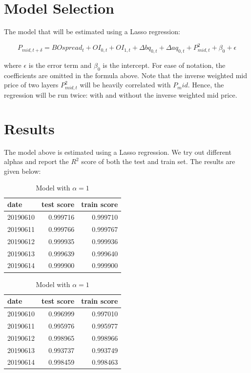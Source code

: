 \documentclass[english, 11pt, a4paper]{article}
\begin{document}
\section{Model Selection}
The model that will be estimated using a Lasso regression:

\begin{equation}
    P_{mid, t + \delta} = BOspread_{t} + OI_{0, t} + OI_{1,t} + \Delta bq_{0,t} + \Delta aq_{0,t} +
    P_{mid, t}^2 + \beta_0 + \epsilon 
\end{equation}

where $\epsilon$ is the error term and $\beta_0$ is the intercept. For ease of notation, the coefficients are omitted in the formula above. 
Note that the inverse weighted mid price of two layers $P_{mid, t}^2$ will be heavily correlated with $P_mid$. 
Hence, the regression will be run twice: with and without the inverse weighted mid price.

\section{Results}
The model above is estimated using a Lasso regression. We try out different alphas and report the
$R^2$ score of both the test and train set. The results are given below:

\begin{table}[H]
  \centering
  \begin{minipage}{.4\textwidth}
    \centering
    \begin{tabular}{lrr}
    \toprule
    date & test score & train score \\
    \midrule
    20190610 & 0.999716 & 0.999710 \\
    20190611 & 0.999766 & 0.999767 \\
    20190612 & 0.999935 & 0.999936 \\
    20190613 & 0.999639 & 0.999640 \\
    20190614 & 0.999900 & 0.999900 \\
    \bottomrule
    \end{tabular}
    \caption{Model with $\alpha = 0.04$}
  \end{minipage}
  \hspace{1cm}
  \begin{minipage}{.4\textwidth}
    \centering
    \begin{tabular}{lrr}
    \toprule
    date & test score & train score \\
    \midrule
    20190610 & 0.996999 & 0.997010 \\
    20190611 & 0.995976 & 0.995977 \\
    20190612 & 0.998965 & 0.998966 \\
    20190613 & 0.993737 & 0.993749 \\
    20190614 & 0.998459 & 0.998463 \\
    \bottomrule
    \end{tabular}
    \caption{Model with $\alpha = 1$}
  \end{minipage}
\end{table}
\end{document}

